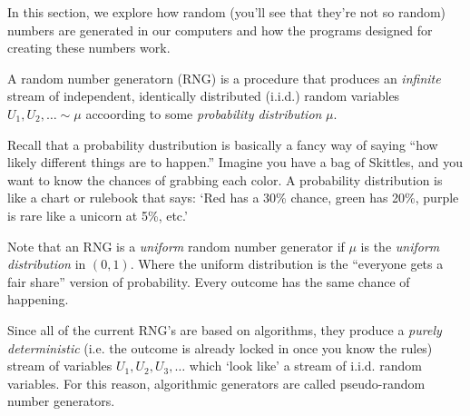 In this section, we explore how random (you'll see that they're not so random) numbers are generated in our computers and how the programs designed for creating these numbers work.

\begin{definition}
    A random number generatorn (RNG) is a procedure that produces an \textit{infinite} stream of independent, identically distributed (i.i.d.) random variables $U_1, U_2, \ldots \sim \mu$
    accoording to some \textit{probability distribution} $\mu$.
\end{definition}

Recall that a probability dustribution is basically a fancy way of saying “how likely different things are to happen.” Imagine you have a bag of Skittles, and you want to know the chances of grabbing each color. 
A probability distribution is like a chart or rulebook that says: `Red has a 30\% chance, green has 20\%, purple is rare like a unicorn at 5\%, etc.'

\begin{remark}
    Note that an RNG is a \textit{uniform} random number generator if $\mu$ is the \textit{uniform distribution} in $(0,1)$. Where the uniform distribution is the “everyone gets a fair share” version of probability. Every outcome has the same chance of happening.
\end{remark}

Since all of the current RNG's are based on algorithms, they produce a \textit{purely deterministic} (i.e. the outcome is already locked in once you know the rules) stream of variables $U_1, U_2, U_3, \ldots$ which `look like' a stream of i.i.d. random variables. 
For this reason, algorithmic generators are called pseudo-random number generators.